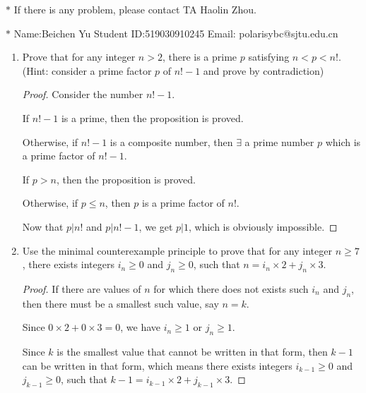 \documentclass[12pt,a4paper]{article}
\theoremstyle{definition}
\begin{document}
\noindent

\noindent{}
\begin{center}
\footnotesize{\color{red}$*$ If there is any problem, please contact TA Haolin Zhou.}

\footnotesize{\color{blue}$*$ Name:Beichen Yu  \quad Student ID:519030910245 \quad Email: polarisybc@sjtu.edu.cn}
\end{center}

\begin{enumerate}
    \item
    Prove that for any integer $n>2$, there is a prime $p$ satisfying $n<p<n!$. {\color{blue}(Hint: consider a prime factor $p$ of $n!-1$ and prove by contradiction)}
    \begin{proof}
        Consider the number $n!-1$.
        
        If $n!-1$ is a prime, then the proposition is proved.
        
        Otherwise, if $n!-1$ is a composite number, then $\exists$ a prime number $p$ which is a prime factor of $n!-1$.
        
        If $p > n$, then the proposition is proved.
        
        Otherwise, if $p \leqslant n$, then $p$ is a prime factor of $n!$.
        
        Now that $p|n!$ and $p|n!-1$, we get $p|1$, which is obviously impossible.
    \end{proof}

    \item
    Use the minimal counterexample principle to prove that for any integer $n\ge 7$, there exists integers $i_n\ge 0$ and $j_n\ge 0$, such that $n = i_n \times 2 + j_n \times 3$.
    \begin{proof}
    
    If there are values of $n$ for which there does not exists such $i_n$ and $ j_n $, then there must be a smallest such value, say $n = k$.
    
    Since $0 \times 2 + 0 \times 3=0$, we have $i_n\geqslant 1$ or $j_n \geqslant1$.
    
    Since $k$ is the smallest value that cannot be written in that form, then $k-1$ can be written in that form, which means there exists integers $i_{k-1}\geqslant 0$ and $j_{k-1}\geqslant 0$, such that $k-1 = i_{k-1} \times 2 + j_{k-1}\times3$.
    

\end{proof}
\end{enumerate}
\end{document}
